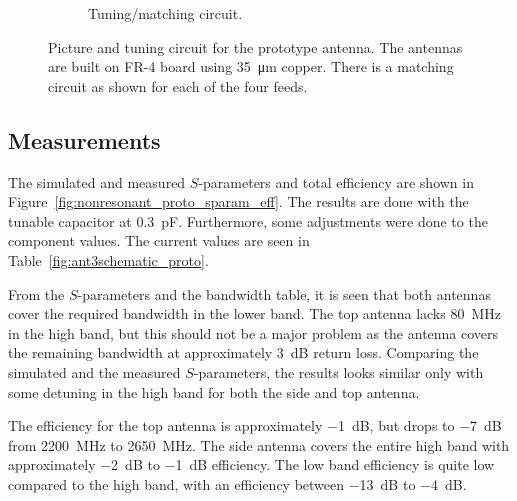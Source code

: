 \begin{figure}[htbp]
\begin{subfigure}[b]{0.49\linewidth}
        \caption{Tuning/matching circuit.}
    \end{subfigure}
    \caption{Picture and tuning circuit for the prototype antenna. The antennas are built on FR-4 board using \SI{35}{\micro\meter} copper. There is a matching circuit as shown for each of the four feeds.}
    \label{fig:ant3techschem_proto}
\end{figure}


\subsection{Measurements} %
The simulated and measured $S$-parameters and total efficiency are shown in Figure~\ref{fig:nonresonant_proto_sparam_eff}. The results are done with the tunable capacitor at \SI{0.3}{pF}. Furthermore, some adjustments were done to the component values. The current values are seen in Table~\ref{fig:ant3schematic_proto}. 

From the $S$-parameters and the bandwidth table, it is seen that both antennas cover the required bandwidth in the lower band. The top antenna lacks \SI{80}{MHz} in the high band, but this should not be a major problem as the antenna covers the remaining bandwidth at approximately \SI{3}{dB} return loss. Comparing the simulated and the measured $S$-parameters, the results looks similar only with some detuning in the high band for both the side and top antenna.

The efficiency for the top antenna is approximately \SI{-1}{dB}, but drops to \SI{-7}{dB} from \SI{2200}{MHz} to \SI{2650}{MHz}. The side antenna covers the entire high band with approximately \SI{-2}{dB} to \SI{-1}{dB} efficiency. The low band efficiency is quite low compared to the high band, with an efficiency between \SI{-13}{dB} to \SI{-4}{dB}.

